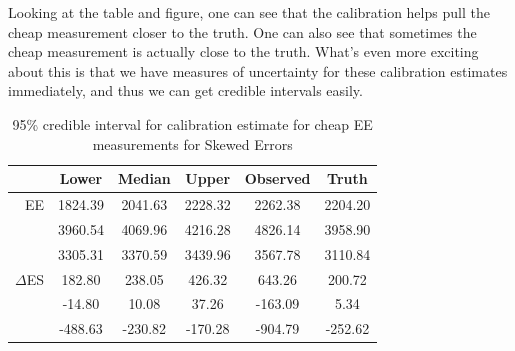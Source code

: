 \documentclass[11pt]{article}\usepackage[]{graphicx}\usepackage[]{color}
\begin{document}
Looking at the table and figure, one can see that the calibration helps pull the cheap measurement closer to the truth. One can also see that sometimes the cheap measurement is actually close to the truth. What's even more exciting about this is that we have measures of uncertainty for these calibration estimates immediately, and thus we can get credible intervals easily.

\begin{table}[ht]
\centering
\begin{tabular}{r|ccc|cc}
  \hline
& Lower & Median & Upper & Observed & Truth \\ 
  \hline
EE & 1824.39 & 2041.63 & 2228.32 & 2262.38 & 2204.20 \\ 
  & 3960.54 & 4069.96 & 4216.28 & 4826.14 & 3958.90 \\ 
  & 3305.31 & 3370.59 & 3439.96 & 3567.78 & 3110.84 \\ 
   \hline  
   $\Delta$ES & 182.80 & 238.05 & 426.32 & 643.26 & 200.72 \\ 
  & -14.80 & 10.08 & 37.26 & -163.09 & 5.34 \\ 
  & -488.63 & -230.82 & -170.28 & -904.79 & -252.62 \\
   \hline
\end{tabular}
\caption{95\% credible interval for calibration estimate for cheap EE measurements for Skewed Errors} 
\label{calibratedee}
\end{table}
\end{document}

